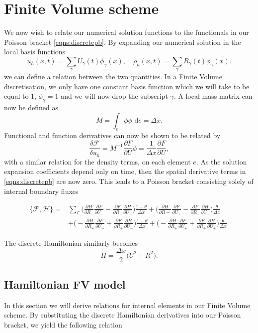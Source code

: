\documentclass[a4paper,11pt]{article}
\begin{document}
\section{Finite Volume scheme}


We now wish to relate our numerical solution functions to the functionals in our Poisson bracket \eqref{eqns:discretepb}.
By expanding  our numerical solution in the local basis functions
\[ u_h(x,t) = \sum_\gamma U_\gamma (t) \phi_\gamma(x), \quad \rho_h(x,t) = \sum_\gamma R_\gamma (t) \phi_\gamma(x).\]
we can define a relation between the two quantities. 
In a  Finite Volume discretisation, we only have one constant basis function which we will take to be equal to 1, $\phi_\gamma = 1$ and we will now drop the subscript $\gamma$.
A local mass matrix can now be defined as  
\[ M = \int_e \phi \phi \text{ d}e = \Delta x.\]
Functional and function derivatives can now be shown to be related by
\[  \frac{\delta  \mathcal{F}}{\delta u_h}  =  M^{-1} \frac{\partial F}{\partial U} \phi = \frac{1}{\Delta x}  \frac{\partial F}{\partial U},\]
with a similar relation for the density terms, on each element $e$.
As the solution expansion coefficients depend only on time, then the spatial derivative terms  in \eqref{eqns:discretepb} are now zero. This leads to a Poisson bracket consisting solely of internal boundary fluxes


 \begin{equation}
\begin{aligned}
 \{ \mathcal{F},  \mathcal{H}\} = & \sum_\Gamma \bigg ( \frac{\partial H}{\partial R_-}\frac{\partial F}{\partial U_-} - \frac{\partial F}{\partial R_-}\frac{\partial H}{\partial U_-}\bigg  ) \frac{1-\theta}{\Delta x} +  \bigg  ( \frac{\partial H}{\partial R-}\frac{\partial F}{\partial U_+} - \frac{\partial F}{\partial R_-}\frac{\partial H}{\partial U_+}\bigg  ) \frac{\theta}{\Delta x}\\
 & + \bigg  ( - \frac{\partial H}{\partial R_+}\frac{\partial F}{\partial U_-} + \frac{\partial F}{\partial R_+}\frac{\partial H}{\partial U_-}\bigg  ) \frac{1-\theta}{\Delta x} + \bigg  ( - \frac{\partial H}{\partial R_+}\frac{\partial F}{\partial U_+} + \frac{\partial F}{\partial R_+}\frac{\partial H}{\partial U_+}\bigg  ) \frac{\theta}{\Delta x}.
 \end{aligned}
 \end{equation}


The discrete Hamiltonian similarly becomes 
\[ H =  \frac{\Delta x}{2}\bigg ( U^2 + R^2 \bigg).\]

\subsection{Hamiltonian FV model}
 In this section we will derive relations for internal elements in our Finite Volume scheme. By substituting the discrete Hamiltonian derivatives into our Poisson bracket, we yield the following relation
 
\end{document}

